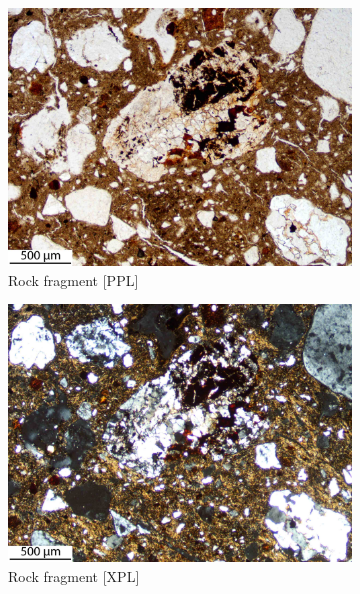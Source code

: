 \documentclass[a4paper]{article}
\begin{document}
\begin{figure}[H]
\begin{subfigure}[t]{.24\textwidth}
		\includegraphics[width=\textwidth]{ThinSections/6-3_4x_PPL.jpg}
		\caption{Rock fragment [PPL]}
	\end{subfigure}\hspace{.1em}\hfill
	\begin{subfigure}[t]{.24\textwidth}
		\includegraphics[width=\textwidth]{ThinSections/6-3_4x_XPL.jpg}
		\caption{Rock fragment [XPL]}
	\end{subfigure}\hspace{.5em}\hfill
	\begin{subfigure}[t]{.24\textwidth}

\end{subfigure}
\end{figure}
\end{document}
